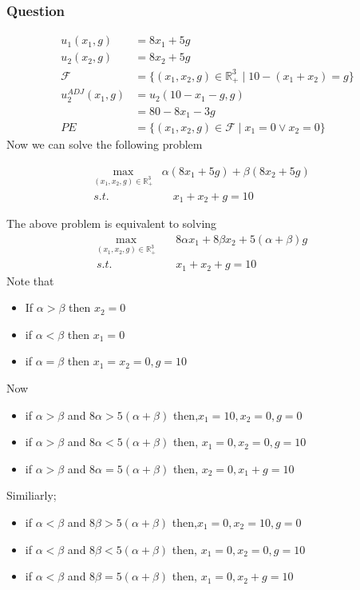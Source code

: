\documentclass[12pt,a4paper,fleqn]{article}
\begin{document}
\subsubsection{Question}
      \begin{align*}
         u_{1}(x_{1},g)&=8x_{1}+5g\\
         u_{2}(x_{2},g)&=8x_{2}+5g\\
         \mathcal{F}&=\{(x_{1},x_{2},g)\in \mathbb{R}^3_{+} \mid 10-(x_{1}+x_{2})=g \} \\
         u_{2}^{ADJ}(x_{1},g) &= u_{2}(10-x_{1}-g,g)\\
         &= 80-8x_{1}-3g\\
         PE &= \{(x_{1},x_{2},g) \in \mathcal{F} \mid x_{1}=0 \vee x_{2}=0\}
     \end{align*}
 Now we can solve the following problem
 \begin{tcolorbox}
 \begin{align*}
        \max_{(x_{1},x_{2},g)\in \mathbb{R}^{3}_{+}} & \alpha(8x_{1}+5g) + \beta(8x_{2}+5g) \quad   \\
        s.t. & \quad x_{1}+x_{2}+g=10
 \end{align*}
 \end{tcolorbox}
 The above problem is equivalent to solving
      \begin{align*}
            \max_{(x_{1},x_{2},g)\in \mathbb{R}^{3}_{+}} & \quad 8 \alpha x_{1} + 8 \beta x_{2} + 5(\alpha+\beta)g \quad  \\
            s.t. & \quad x_{1}+x_{2}+g=10 \quad 
     \end{align*}
 Note that
      \begin{itemize}
        \item If \(\alpha>\beta \) then \( x_{2}=0\)
        \item if \(\alpha<\beta \) then \( x_{1}=0\)
        \item if \(\alpha=\beta \) then \( x_{1}=x_{2}=0, g=10\) 
      \end{itemize}
\pagebreak
 Now
 \begin{itemize}
    \item if \( \alpha > \beta \) and \(8\alpha > 5(\alpha+\beta)\) then,\(x_{1}=10, x_{2}=0, g=0 \)
    \item if \(\alpha > \beta \) and \( 8\alpha < 5(\alpha+\beta)\) then, \(x_{1}=0, x_{2}=0, g=10 \) 
    \item if \(\alpha > \beta \) and \( 8\alpha = 5(\alpha+\beta)\) then, \( x_{2}=0, x_{1}+ g=10 \)    
 \end{itemize} 
Similiarly;
\begin{itemize}
    \item if \( \alpha < \beta \) and \(8\beta > 5(\alpha+\beta)\) then,\(x_{1}=0, x_{2}=10, g=0 \)
    \item if \(\alpha < \beta \) and \( 8\beta < 5(\alpha+\beta)\) then, \(x_{1}=0, x_{2}=0, g=10 \) 
    \item if \(\alpha < \beta \) and \( 8\beta = 5(\alpha+\beta)\) then, \( x_{1}=0, x_{2}+ g=10 \)    
 \end{itemize} 
\end{document}

